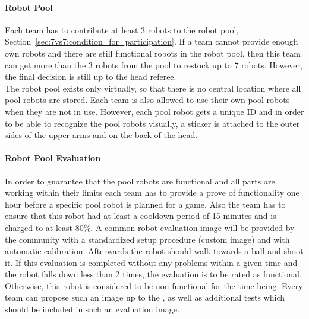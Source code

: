         \paragraph{Robot Pool}
            Each team has to contribute at least 3 robots to the robot pool, \cf Section~\ref{sec:7vs7:condition_for_participation}. If a team cannot provide enough own robots and there are still functional robots in the robot pool, then this team can get more than the 3 robots from the pool to restock up to 7 robots. However, the final decision is still up to the head referee. \\
            The robot pool exists only virtually, so that there is no central location where all pool robots are stored. Each team is also allowed to use their own pool robots when they are not in use. However, each pool robot gets a unique ID and in order to be able to recognize the pool robots visually, a sticker is attached to the outer sides of the upper arms and on the back of the head. 

        \paragraph{Robot Pool Evaluation}
            In order to guarantee that the pool robots are functional and all parts are working within their limits each team has to provide a prove of functionality one hour before a specific pool robot is planned for a game. Also the team has to ensure that this robot had at least a cooldown period of 15 minutes and is charged to at least 80\%. 
            A common robot evaluation image will be provided by the community with a standardized setup procedure (custom image) and with automatic calibration. Afterwards the robot should walk towards a ball and shoot it. If this evaluation is completed without any problems within a given time  and the robot falls down less than 2 times, the evaluation is to be rated as functional. Otherwise, this robot is considered to be non-functional for the time being. Every team can propose such an image up to the , as well as additional tests which should be included in such an evaluation image.            

